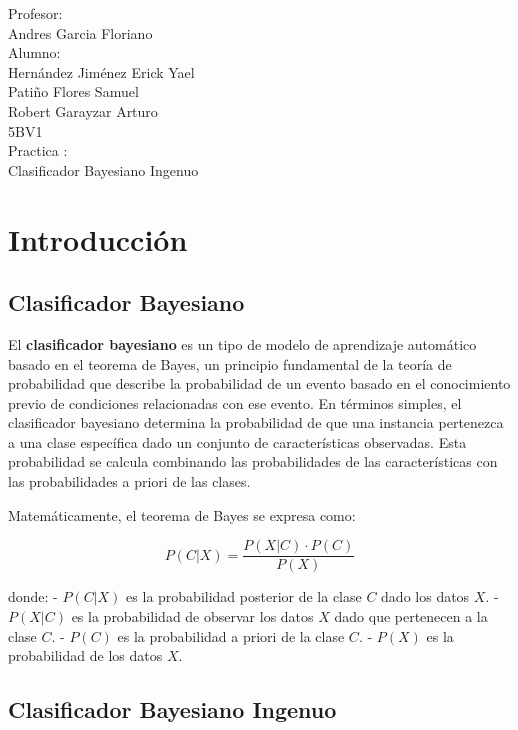 \documentclass{article}
\begin{document}
\begin{titlepage}
\begin{spacing}{2}
\begin{center}
{{{                        Profesor:  \\  Andres Garcia Floriano \\
                        Alumno: \\ Hernández Jiménez Erick Yael \\ Patiño Flores Samuel \\ Robert Garayzar Arturo \\ 
                        5BV1 \\ 
                        Practica :  \\ Clasificador Bayesiano Ingenuo }}}
        \end{center}
        \end{spacing}       
    \end{titlepage}
    
    \pagestyle{fancy}
    \fancyhf{}
    \fancyfoot[C]{\thepage} 
    \renewcommand{\headrulewidth}{0pt} 
    \newpage
    \tableofcontents
    \newpage
    \section{Introducción}
    \subsection{Clasificador Bayesiano}
    El \textbf{clasificador bayesiano} es un tipo de modelo de aprendizaje automático basado en el teorema de Bayes, un principio fundamental de la teoría de probabilidad que describe la probabilidad de un evento basado en el conocimiento previo de condiciones relacionadas con ese evento. En términos simples, el clasificador bayesiano determina la probabilidad de que una instancia pertenezca a una clase específica dado un conjunto de características observadas. Esta probabilidad se calcula combinando las probabilidades de las características con las probabilidades a priori de las clases. 

    Matemáticamente, el teorema de Bayes se expresa como:

    \[
    P(C|X) = \frac{P(X|C) \cdot P(C)}{P(X)}
    \]

donde:
- \( P(C|X) \) es la probabilidad posterior de la clase \( C \) dado los datos \( X \).
- \( P(X|C) \) es la probabilidad de observar los datos \( X \) dado que pertenecen a la clase \( C \).
- \( P(C) \) es la probabilidad a priori de la clase \( C \).
- \( P(X) \) es la probabilidad de los datos \( X \).

\subsection{Clasificador Bayesiano Ingenuo}
\end{document}
